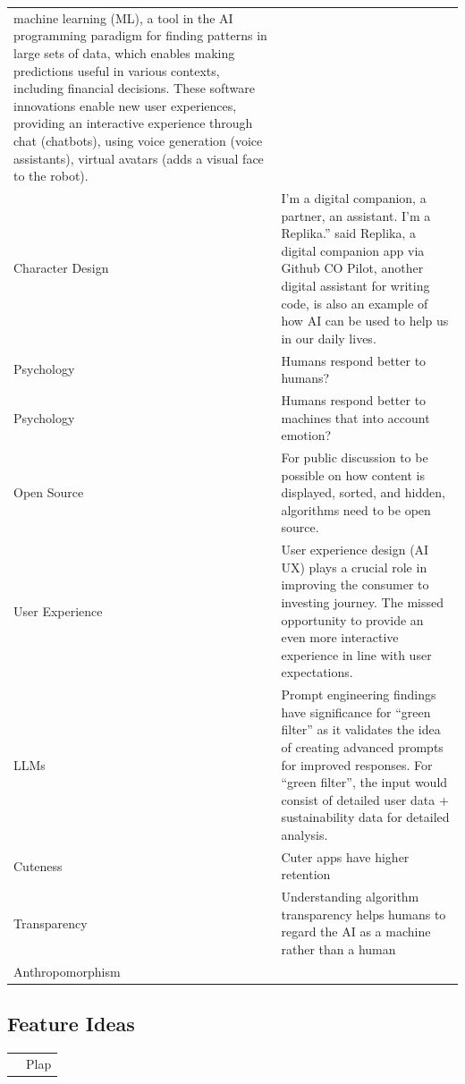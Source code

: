 \documentclass[
  letterpaper,
  DIV=11,
  numbers=noendperiod]{scrartcl}
\begin{document}
\begin{longtable}[]{@{}
  >{\raggedright\arraybackslash}p{}
  >{\raggedright\arraybackslash}p{}@{}}
machine learning (ML), a tool in the AI programming paradigm for finding
patterns in large sets of data, which enables making predictions useful
in various contexts, including financial decisions. These software
innovations enable new user experiences, providing an interactive
experience through chat (chatbots), using voice generation (voice
assistants), virtual avatars (adds a visual face to the robot). \\
Character Design & I'm a digital companion, a partner, an assistant. I'm
a Replika.'' said Replika, a digital companion app via Github CO Pilot,
another digital assistant for writing code, is also an example of how AI
can be used to help us in our daily lives. \\
Psychology & Humans respond better to humans? \\
Psychology & Humans respond better to machines that into account
emotion? \\
Open Source & For public discussion to be possible on how content is
displayed, sorted, and hidden, algorithms need to be open source. \\
User Experience & User experience design (AI UX) plays a crucial role in
improving the consumer to investing journey. The missed opportunity to
provide an even more interactive experience in line with user
expectations. \\
LLMs & Prompt engineering findings have significance for ``green
filter'' as it validates the idea of creating advanced prompts for
improved responses. For ``green filter'', the input would consist of
detailed user data + sustainability data for detailed analysis. \\
Cuteness & Cuter apps have higher retention \\
Transparency & Understanding algorithm transparency helps humans to
regard the AI as a machine rather than a human \\
Anthropomorphism & \\
\end{longtable}

\subsection{Feature Ideas}\label{feature-ideas-3}

\begin{longtable}[]{@{}ll@{}}
\toprule\noalign{}
\endhead
\bottomrule\noalign{}
\endlastfoot
& Plap \\
\end{longtable}
\end{document}
